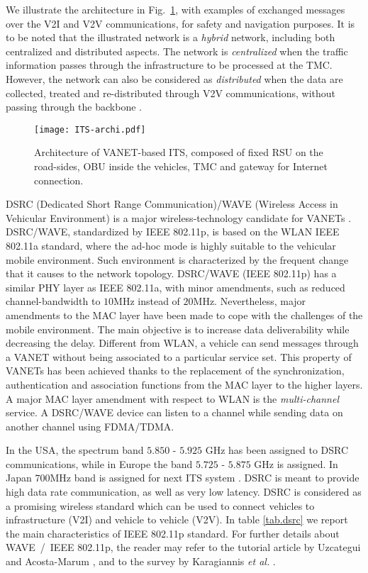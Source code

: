 \documentclass[10pt,onecolumn]{article}
\begin{document}
We illustrate the architecture in Fig.~\ref{fig:vanet1}, with examples of exchanged messages over the V2I and V2V communications, for safety and navigation purposes. 
It is to be noted that the illustrated network is a \textit{hybrid} network, including both centralized and distributed aspects. 
The network is \textit{centralized} when the traffic information passes through the infrastructure to be processed at the TMC. 
However, the network can also be considered as \textit{distributed} when the data are collected, treated and re-distributed through V2V communications, without passing through the backbone \cite{Jerbi2007, Panichpapiboon2008, Garelli2011}.

\begin{figure}[ht] 
\centering
\texttt{[image: ITS-archi.pdf]}
\caption{Architecture of VANET-based ITS, composed of fixed RSU on the road-sides, OBU inside the vehicles, TMC and gateway for Internet connection.}
\label{fig:vanet1}
\end{figure} 

DSRC (Dedicated Short Range Communication)/WAVE (Wireless Access in Vehicular Environment) is a major wireless-technology candidate for VANETs \cite{NotesDSRC10}.
DSRC/WAVE, standardized by IEEE 802.11p, is based on the WLAN IEEE 802.11a standard, where the ad-hoc mode is highly suitable to the vehicular mobile environment. Such environment is characterized by the frequent change that it causes to the network topology. 
DSRC/WAVE (IEEE 802.11p) has a similar PHY layer as IEEE 802.11a, with minor amendments, such as reduced channel-bandwidth to $10$MHz instead of $20$MHz. Nevertheless, major amendments to the MAC layer have been made to cope with the challenges of the mobile environment. 
The main objective is to increase data deliverability while decreasing the delay. Different from WLAN, a vehicle can send messages through a VANET without being associated to a particular service set. This property of VANETs has been achieved thanks to the replacement of the synchronization, authentication and association functions from the MAC layer to the higher layers.
A major MAC layer amendment with respect to WLAN is the \textit{multi-channel} service. A DSRC/WAVE device can listen to a channel while sending data on another channel using FDMA/TDMA.

In the USA, the spectrum band $5.850$ - $5.925$ GHz has been assigned to DSRC communications, while in Europe the band $5.725$ - $5.875$ GHz is assigned. In Japan $700$MHz band is assigned for next ITS system \cite{wave}. DSRC is meant to provide high data rate communication, as well as very low latency. DSRC is considered as a promising wireless standard which can be used to connect vehicles to infrastructure (V2I) and vehicle to vehicle (V2V). 
In table \ref{tab.dsrc} we report the main characteristics of IEEE 802.11p standard.
For further details about WAVE~/~IEEE 802.11p, the reader may refer to the tutorial article by Uzcategui and Acosta-Marum \cite{uzcategui2009wave}, and to the survey by Karagiannis \textit{et al.} \cite{karagiannis2011vehicular}.
\end{document}
